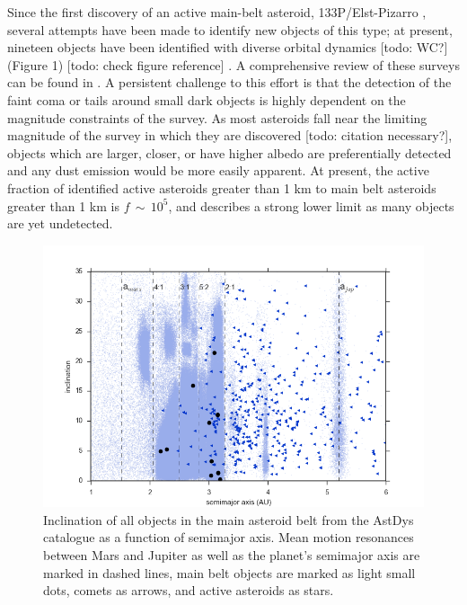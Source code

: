 \documentclass[iop,apj]{emulateapj}
\begin{document}
Since the first discovery of an active main-belt asteroid, 133P/Elst-Pizarro \citep{elst96}, several attempts have been made to identify new objects of this type; at present, nineteen objects have been identified with diverse orbital dynamics [todo: WC?] (Figure 1) [todo: check figure reference] \citep{jewitt15, hsieh15}. A comprehensive review of these surveys can be found in \citet{hsieh15}.  A persistent challenge to this effort is that the detection of the faint coma or tails around small dark objects is highly dependent on the magnitude constraints of the survey. As most asteroids fall near the limiting magnitude of the survey in which they are discovered [todo: citation necessary?], objects which are larger, closer, or have higher albedo are preferentially detected and any dust emission would be more easily apparent. At present, the active fraction of identified active asteroids greater than 1 km to main belt asteroids greater than 1 km is $f \, \sim \, 10^5$, and describes a strong lower limit as many objects are yet undetected. \citep{jewitt15} %

\begin{figure}[!htb]
    \centering
    \includegraphics[width=\linewidth]{graphs/aa_comets_mba_all.png}
    \caption{Inclination of all objects in the main asteroid belt from the AstDys catalogue as a function of semimajor axis.  Mean motion resonances between Mars and Jupiter as well as the planet's semimajor axis are marked in dashed lines, main belt objects are marked as light small dots, comets as arrows, and active asteroids as stars.}\label{fig:1}
\end{figure}
\end{document}
